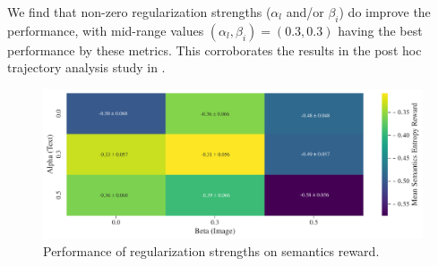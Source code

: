 We find that non-zero regularization strengths (\(\alpha_{l}\) and/or \(\beta_{i}\)) do improve the performance, with mid-range values \((\alpha_{l}, \beta_{i}) = (0.3, 0.
3)\) having the best performance by these metrics.
This corroborates the results in the post hoc trajectory analysis study in .

\begin{figure}[H]
    \centering
    \includegraphics[width=\textwidth]{images/alpha_beta-semantics_rair_with_std.pdf}
    \caption{Performance of regularization strengths on semantics reward.}
    \label{fig:alpha-beta-semantics}
\end{figure}


